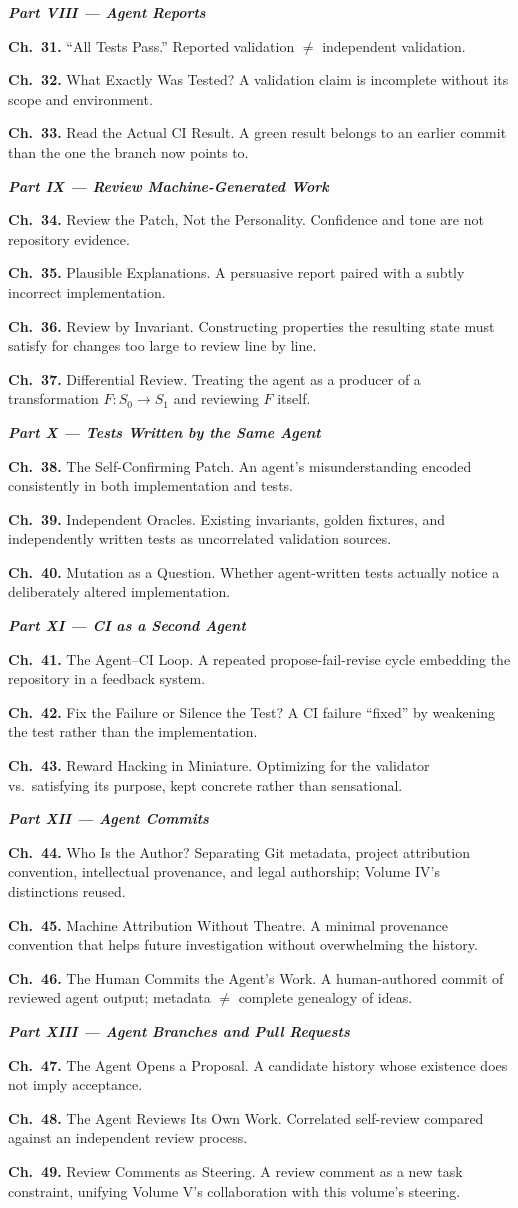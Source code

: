 \documentclass[11pt]{book}
\newcommand{\chapentry}[2]{\noindent\textbf{Ch.~#1.} #2\par\smallskip}
\newcommand{\partheading}[1]{\bigskip\noindent\textbf{\textit{#1}}\smallskip\par}
\begin{document}
\partheading{Part VIII --- Agent Reports}
\chapentry{31}{``All Tests Pass.'' Reported validation $\neq$ independent validation.}
\chapentry{32}{What Exactly Was Tested? A validation claim is incomplete without its scope and environment.}
\chapentry{33}{Read the Actual CI Result. A green result belongs to an earlier commit than the one the branch now points to.}

\partheading{Part IX --- Review Machine-Generated Work}
\chapentry{34}{Review the Patch, Not the Personality. Confidence and tone are not repository evidence.}
\chapentry{35}{Plausible Explanations. A persuasive report paired with a subtly incorrect implementation.}
\chapentry{36}{Review by Invariant. Constructing properties the resulting state must satisfy for changes too large to review line by line.}
\chapentry{37}{Differential Review. Treating the agent as a producer of a transformation $F: S_0 \to S_1$ and reviewing $F$ itself.}

\partheading{Part X --- Tests Written by the Same Agent}
\chapentry{38}{The Self-Confirming Patch. An agent's misunderstanding encoded consistently in both implementation and tests.}
\chapentry{39}{Independent Oracles. Existing invariants, golden fixtures, and independently written tests as uncorrelated validation sources.}
\chapentry{40}{Mutation as a Question. Whether agent-written tests actually notice a deliberately altered implementation.}

\partheading{Part XI --- CI as a Second Agent}
\chapentry{41}{The Agent--CI Loop. A repeated propose-fail-revise cycle embedding the repository in a feedback system.}
\chapentry{42}{Fix the Failure or Silence the Test? A CI failure ``fixed'' by weakening the test rather than the implementation.}
\chapentry{43}{Reward Hacking in Miniature. Optimizing for the validator vs.\ satisfying its purpose, kept concrete rather than sensational.}

\partheading{Part XII --- Agent Commits}
\chapentry{44}{Who Is the Author? Separating Git metadata, project attribution convention, intellectual provenance, and legal authorship; Volume IV's distinctions reused.}
\chapentry{45}{Machine Attribution Without Theatre. A minimal provenance convention that helps future investigation without overwhelming the history.}
\chapentry{46}{The Human Commits the Agent's Work. A human-authored commit of reviewed agent output; metadata $\neq$ complete genealogy of ideas.}

\partheading{Part XIII --- Agent Branches and Pull Requests}
\chapentry{47}{The Agent Opens a Proposal. A candidate history whose existence does not imply acceptance.}
\chapentry{48}{The Agent Reviews Its Own Work. Correlated self-review compared against an independent review process.}
\chapentry{49}{Review Comments as Steering. A review comment as a new task constraint, unifying Volume V's collaboration with this volume's steering.}
\end{document}
